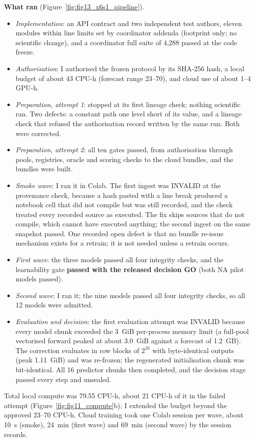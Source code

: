 \documentclass[11pt,a4paper]{article}
\DeclareRobustCommand{\_}{\ifmmode\origunderscore\else\textunderscore\allowbreak\fi}
\begin{document}
\textbf{What ran} (Figure~\ref{fig:fig13_x6s1_pipeline}).
\begin{itemize}
\item \emph{Implementation}: an API contract and two independent test authors, eleven
modules within line limits set by coordinator addenda (footprint only; no scientific
change), and a coordinator full suite of 4,288 passed at the code freeze.
\item \emph{Authorisation}: I authorised the frozen protocol by its SHA-256 hash, a local budget
of about 43 CPU-h (forecast range 23--70), and cloud use of about 1--4 GPU-h.
\item \emph{Preparation, attempt 1}: stopped at its first lineage check; nothing scientific ran.
Two defects: a constant path one level short of its value, and a lineage check that refused the
authorisation record written by the same run. Both were corrected.
\item \emph{Preparation, attempt 2}: all ten gates passed, from authorisation through pools,
registries, oracle and scoring checks to the cloud bundles, and the bundles were built.
\item \emph{Smoke wave}: I ran it in Colab. The first ingest was INVALID at the provenance check,
because a hash pasted with a line break produced a notebook cell that did not compile but was
still recorded, and the check treated every recorded source as executed. The fix skips sources
that do not compile, which cannot have executed anything; the second ingest on the same
snapshot passed. One recorded open defect is that no bundle re-issue mechanism exists for a
retrain; it is not needed unless a retrain occurs.
\item \emph{First wave}: the three models passed all four integrity checks, and the learnability
gate \textbf{passed with the released decision GO} (both NA pilot models passed).
\item \emph{Second wave}: I ran it; the nine models passed all four integrity checks, so all 12
models were admitted.
\item \emph{Evaluation and decision}: the first evaluation attempt was INVALID because every model
chunk exceeded the 3~GiB per-process memory limit (a full-pool vectorised forward peaked at about
3.0~GiB against a forecast of 1.2~GB). The correction evaluates in row blocks of $2^{16}$ with
byte-identical outputs (peak 1.11~GiB) and was re-frozen; the regenerated initialisation chunk
was bit-identical. All 16 predictor chunks then completed, and the decision stage passed every
step and unsealed.
\end{itemize}
Total local compute was 79.55 CPU-h, about 21 CPU-h of it in the failed attempt
(Figure~\ref{fig:fig11_compute}b); I extended the budget beyond the approved 23--70
CPU-h. Cloud training took one Colab session per wave, about 10~s (smoke), 24~min (first wave)
and 69~min (second wave) by the session records.
\end{document}
